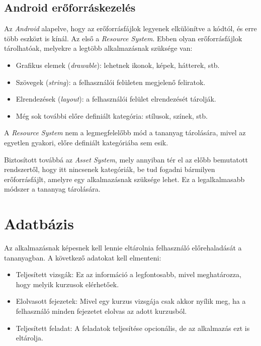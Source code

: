 \documentclass[12pt,a4paper]{article}
\begin{document}
	\subsection{Android erőforráskezelés}
	
	Az \textit{Android} alapelve, hogy az erőforrásfájlok legyenek elkülönítve a kódtól, és erre több eszközt is kínál. Az első a \textit{Resource System}. Ebben olyan erőforrásfájlok tárolhatóak, melyekre a legtöbb alkalmazásnak szüksége van:
	
	\begin{itemize}
		\item Grafikus elemek (\textit{drawable}): lehetnek ikonok, képek, hátterek, stb.
		\item Szövegek (\textit{string}): a felhasználói felületen megjelenő feliratok.
		\item Elrendezések (\textit{layout}): a felhasználói felület elrendezését tárolják.
		\item Még sok további előre definiált kategória: stílusok, színek, stb.
	\end{itemize} 

	A \textit{Resource System} nem a legmegfelelőbb mód a tananyag tárolására, mivel az egyetlen gyakori, előre definiált kategóriába sem esik. 
	
	Biztosított továbbá az \textit{Asset System}, mely annyiban tér el az előbb bemutatott rendszertől, hogy itt nincsenek kategóriák, be tud fogadni bármilyen erőforrásfájlt, amelyre egy alkalmazásnak szüksége lehet. Ez a legalkalmasabb módszer a tananyag tárolására.
	
	\section{Adatbázis}
	
	Az alkalmazásnak képesnek kell lennie eltárolnia felhasználó előrehaladását a tananyagban. A következő adatokat kell elmenteni:
	
	\begin{itemize}
		\item Teljesített vizsgák: Ez az információ a legfontosabb, mivel meghatározza, hogy melyik kurzusok elérhetőek.
		\item Elolvasott fejezetek: Mivel egy kurzus vizsgája csak akkor nyílik meg, ha a felhasználó minden fejezetet elolvas az adott kurzusból.
		\item Teljesített feladat: A feladatok teljesítése opcionális, de az alkalmazás ezt is eltárolja.
	\end{itemize}
	
\end{document}
